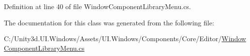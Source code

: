 Definition at line 40 of file Window\+Component\+Library\+Menu.\+cs.



The documentation for this class was generated from the following file\+:\begin{DoxyCompactItemize}
\item 
C\+:/\+Unity3d.\+U\+I.\+Windows/\+Assets/\+U\+I.\+Windows/\+Components/\+Core/\+Editor/\hyperlink{_window_component_library_menu_8cs}{Window\+Component\+Library\+Menu.\+cs}\end{DoxyCompactItemize}
